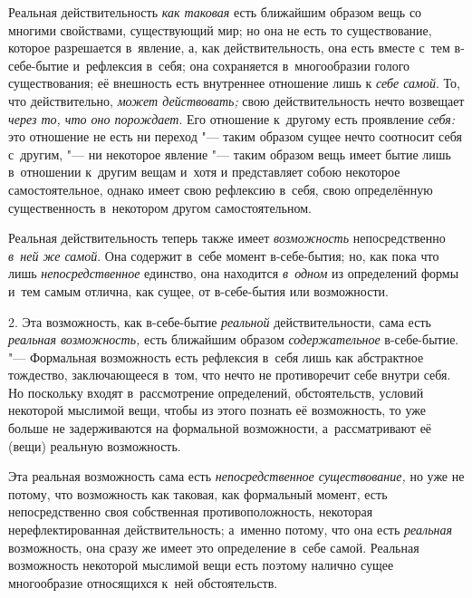 Реальная действительность {\em как таковая} есть
ближайшим образом вещь со многими свойствами, существующий мир; но она не
есть то существование, которое разрешается в~явление, а, как
действительность, она есть вместе с~тем в-себе-бытие и~рефлексия в~себя;
она сохраняется в~многообразии голого существования; её внешность есть
внутреннее отношение лишь к {\em себе самой}. То, что
действительно, {\em может действовать;} свою
действительность нечто возвещает {\em через то, что оно
порождает}. Его отношение к~другому есть проявление
{\em себя:} это отношение не есть ни переход "--- таким образом сущее
нечто соотносит себя с~другим, "--- ни некоторое явление "--- таким
образом вещь имеет бытие лишь в~отношении к~другим вещам и~хотя и
представляет собою некоторое самостоятельное, однако имеет свою рефлексию
в~себя, свою определённую существенность в~некотором другом самостоятельном.

Реальная действительность теперь также имеет {\em возможность} непосредственно
{\em в~ней же самой}. Она содержит в~себе момент в-себе-бытия; но, как
пока что лишь {\em непосредственное} единство, она находится {\em в~одном}
из определений формы и~тем самым отлична, как сущее, от в-себе-бытия или
возможности.

2. Эта возможность, как в-себе-бытие {\em реальной}
действительности, сама есть {\em реальная возможность,}
есть ближайшим образом {\em содержательное}
в-себе-бытие. "--- Формальная возможность есть рефлексия в~себя лишь как
абстрактное тождество, заключающееся в~том, что нечто не противоречит себе
внутри себя. Но поскольку входят в~рассмотрение определений, обстоятельств,
условий некоторой мыслимой вещи, чтобы из этого познать её возможность, то
уже больше не задерживаются на формальной возможности, а~рассматривают её
(вещи) реальную возможность.

Эта реальная возможность сама есть {\em непосредственное
существование,} но уже не потому, что возможность как таковая, как
формальный момент, есть непосредственно своя собственная противоположность,
некоторая нерефлектированная действительность; а~именно потому, что она
есть {\em реальная} возможность, она сразу же имеет это
определение в~себе самой. Реальная возможность некоторой мыслимой вещи есть
поэтому налично сущее многообразие относящихся к~ней обстоятельств.

